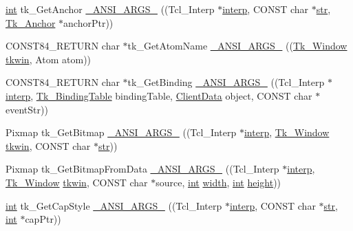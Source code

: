 \begin{DoxyCompactItemize}
\item 
\hyperlink{tk_8h_a83f82f76e7fed06f4c49d2db94028a6d}{int} tk\+\_\+\+Get\+Anchor \hyperlink{struct_tk_stubs_aa3ec34432120d4536f072f34088158ca}{\+\_\+\+A\+N\+S\+I\+\_\+\+A\+R\+G\+S\+\_\+} ((Tcl\+\_\+\+Interp $\ast$\hyperlink{tk_8h_a5ab79c0f5849ee8e6a2e955a6c536cc0}{interp}, C\+O\+N\+ST char $\ast$\hyperlink{morph_8c_ab50d783982593ef993ea0b68f7ad8b80}{str}, \hyperlink{tk_8h_a808936cc13d4585115aa0be26f21a167}{Tk\+\_\+\+Anchor} $\ast$anchor\+Ptr))
\item 
C\+O\+N\+S\+T84\+\_\+\+R\+E\+T\+U\+RN char $\ast$tk\+\_\+\+Get\+Atom\+Name \hyperlink{struct_tk_stubs_a910080773a8aa516d14960c57ba0929d}{\+\_\+\+A\+N\+S\+I\+\_\+\+A\+R\+G\+S\+\_\+} ((\hyperlink{tk_8h_ab756137de3ee74edc2501bd0d761e37c}{Tk\+\_\+\+Window} \hyperlink{tk_8h_a35df722e7e1b6efd651683b8be7c1490}{tkwin}, Atom atom))
\item 
C\+O\+N\+S\+T84\+\_\+\+R\+E\+T\+U\+RN char $\ast$tk\+\_\+\+Get\+Binding \hyperlink{struct_tk_stubs_ae07672b50a829a48aea17b6ff737bbc9}{\+\_\+\+A\+N\+S\+I\+\_\+\+A\+R\+G\+S\+\_\+} ((Tcl\+\_\+\+Interp $\ast$\hyperlink{tk_8h_a5ab79c0f5849ee8e6a2e955a6c536cc0}{interp}, \hyperlink{tk_8h_aba3b4bb6109d20b6e4bf79b230f23566}{Tk\+\_\+\+Binding\+Table} binding\+Table, \hyperlink{tk_8h_accf84b4d725a8f41e04d6333768a6001}{Client\+Data} object, C\+O\+N\+ST char $\ast$event\+Str))
\item 
Pixmap tk\+\_\+\+Get\+Bitmap \hyperlink{struct_tk_stubs_a3547b53aa66c4328c0e2578018c77b8e}{\+\_\+\+A\+N\+S\+I\+\_\+\+A\+R\+G\+S\+\_\+} ((Tcl\+\_\+\+Interp $\ast$\hyperlink{tk_8h_a5ab79c0f5849ee8e6a2e955a6c536cc0}{interp}, \hyperlink{tk_8h_ab756137de3ee74edc2501bd0d761e37c}{Tk\+\_\+\+Window} \hyperlink{tk_8h_a35df722e7e1b6efd651683b8be7c1490}{tkwin}, C\+O\+N\+ST char $\ast$\hyperlink{morph_8c_ab50d783982593ef993ea0b68f7ad8b80}{str}))
\item 
Pixmap tk\+\_\+\+Get\+Bitmap\+From\+Data \hyperlink{struct_tk_stubs_af2b1049a4e23570a50ba28cd4803f5fa}{\+\_\+\+A\+N\+S\+I\+\_\+\+A\+R\+G\+S\+\_\+} ((Tcl\+\_\+\+Interp $\ast$\hyperlink{tk_8h_a5ab79c0f5849ee8e6a2e955a6c536cc0}{interp}, \hyperlink{tk_8h_ab756137de3ee74edc2501bd0d761e37c}{Tk\+\_\+\+Window} \hyperlink{tk_8h_a35df722e7e1b6efd651683b8be7c1490}{tkwin}, C\+O\+N\+ST char $\ast$source, \hyperlink{tk_8h_a83f82f76e7fed06f4c49d2db94028a6d}{int} \hyperlink{tk_8h_a29e50a5401c1396b3a2aa3487f74d468}{width}, \hyperlink{tk_8h_a83f82f76e7fed06f4c49d2db94028a6d}{int} \hyperlink{tk_8h_a67be2f4b9d9c5b3559139bfb072e2e81}{height}))
\item 
\hyperlink{tk_8h_a83f82f76e7fed06f4c49d2db94028a6d}{int} tk\+\_\+\+Get\+Cap\+Style \hyperlink{struct_tk_stubs_ab550b462bd64504b8af5e1cd875789ba}{\+\_\+\+A\+N\+S\+I\+\_\+\+A\+R\+G\+S\+\_\+} ((Tcl\+\_\+\+Interp $\ast$\hyperlink{tk_8h_a5ab79c0f5849ee8e6a2e955a6c536cc0}{interp}, C\+O\+N\+ST char $\ast$\hyperlink{morph_8c_ab50d783982593ef993ea0b68f7ad8b80}{str}, \hyperlink{tk_8h_a83f82f76e7fed06f4c49d2db94028a6d}{int} $\ast$cap\+Ptr))

\end{DoxyCompactItemize}
